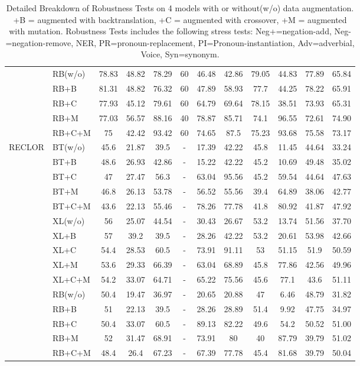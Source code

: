 \documentclass[11pt,a4paper]{article}
\begin{document}
\begin{table}[th]
\begin{tabular}{ll|c|ccccccccc}
\cline{2-12} 
&RB(w/o)&78.83&48.82&78.29&60&46.48&42.86&79.05&44.83&77.89&65.84 \\ 
&RB+B&81.31&48.82&76.32&60&47.89&58.93&77.7&44.25&78.22&65.91 \\ 
&RB+C&77.93&45.12&79.61&60&64.79&69.64&78.15&38.51&73.93&65.31 \\ 
&RB+M&77.03&56.57&88.16&40&78.87&85.71&74.1&96.55&72.61&74.90 \\ 
&RB+C+M&75&42.42&93.42&60&74.65&87.5&75.23&93.68&75.58&73.17 \\    
	\hline
\multirow{15}{*}{RECLOR} 
&BT(w/o)&45.6&21.87&39.5&-&17.39&42.22&45.8&11.45&44.64&33.24 \\ 
&BT+B&48.6&26.93&42.86&-&15.22&42.22&45.2&10.69&49.48&35.02 \\ 
&BT+C&47&27.47&56.3&-&63.04&95.56&45.2&59.54&44.64&47.63 \\ 
&BT+M&46.8&26.13&53.78&-&56.52&55.56&39.4&64.89&38.06&42.77 \\ 
&BT+C+M&43.6&22.13&55.46&-&78.26&77.78&41.8&80.92&41.87&47.92 \\ 
\cline{2-12} 
&XL(w/o)&56&25.07&44.54&-&30.43&26.67&53.2&13.74&51.56&37.70 \\ 
&XL+B&57&39.2&39.5&-&28.26&42.22&53.2&20.61&53.98&42.66 \\ 
&XL+C&54.4&28.53&60.5&-&73.91&91.11&53&51.15&51.9&50.59 \\ 
&XL+M&53.6&29.33&66.39&-&63.04&68.89&45.8&77.86&42.56&49.96 \\ 
&XL+C+M&54.2&33.07&64.71&-&65.22&75.56&45.6&77.1&43.6&51.11 \\ 
\cline{2-12} 
&RB(w/o)&50.4&19.47&36.97&-&20.65&20.88&47&6.46&48.79&31.82 \\ 
&RB+B&51&22.13&39.5&-&28.26&28.89&51.4&9.92&47.75&34.97 \\ 
&RB+C&50.4&33.07&60.5&-&89.13&82.22&49.6&54.2&50.52&51.00 \\ 
&RB+M&52&31.47&68.91&-&73.91&80&40&87.79&39.79&51.02 \\ 
&RB+C+M&48.4&26.4&67.23&-&67.39&77.78&45.4&81.68&39.79&50.04 \\
\bottomrule
\hline
\end{tabular}
\caption{\label{tab:results} Detailed Breakdown of Robustness Tests
on 4 models with or without(w/o) data augmentation. 
+B = augmented with backtranslation,
+C = augmented with crossover, +M = augmented with mutation. 
Robustness Tests includes the following stress tests: 
Neg+=negation-add, Neg-=negation-remove, NER, 
PR=pronoun-replacement, PI=Pronoun-instantiation, Adv=adverbial, Voice, Syn=synonym.}
\end{table}
\end{document}
